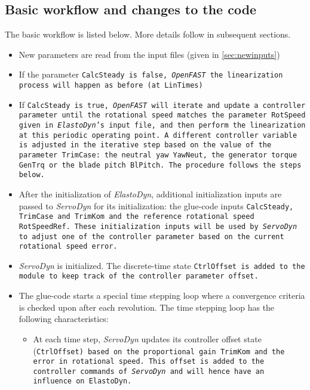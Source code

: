 \documentclass[11pt]{article}
\begin{document}
\subsection{Basic workflow and changes to the code}
The basic workflow is listed below. More details follow in subsequent sections.
\begin{itemize}\tightlist
    \item New parameters are read from the input files (given in \autoref{sec:newinputs})
    \item If the parameter \tt{CalcSteady} is false, \textit{OpenFAST} the linearization process will happen as before (at LinTimes)
    \item 
      If \tt{CalcSteady} is true, \textit{OpenFAST} will iterate and update a controller parameter
      until the rotational speed matches the parameter \tt{RotSpeed} given in \textit{ElastoDyn}'s input file, and then perform the linearization at this periodic operating point.
     A different controller variable is adjusted in the iterative step based on the value of the parameter \tt{TrimCase}: the neutral yaw \tt{YawNeut}, the generator torque \tt{GenTrq} or the blade pitch \tt{BlPitch}. 
     The procedure follows the steps below.
    \item After the initialization of \textit{ElastoDyn}, additional initialization inputs are passed to \textit{ServoDyn} for its initialization:  the glue-code inputs \tt{CalcSteady}, \tt{TrimCase} and \tt{TrimKom} and the reference rotational speed \tt{RotSpeedRef}. These initialization inputs will be used by \textit{ServoDyn} to adjust one of the controller parameter based on the current rotational speed error.
    \item \textit{ServoDyn} is initialized. The discrete-time state \tt{CtrlOffset} is added to the module to keep track of the controller parameter offset.
    \item The glue-code starts a special time stepping loop where a convergence criteria is checked upon after each revolution.  The time stepping loop has the following characteristics:
    \begin{itemize}\tightlist
    \item At each time step, \textit{ServoDyn} updates its controller offset state (\tt{CtrlOffset}) based on the proportional gain \tt{TrimKom} and the error in rotational speed. This offset is added to the controller commands of \textit{ServoDyn} and will hence have an influence on \tt{ElastoDyn}. 

\end{itemize}
\end{itemize}
\end{document}

